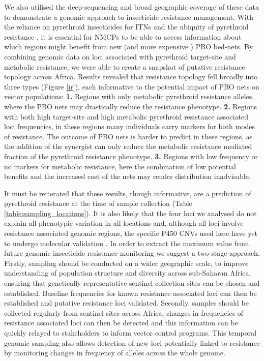 \documentclass[a4paper,11pt,abstracton,hidelinks]{scrartcl}
\begin{document}
We also utilised the deep-sequencing and broad geographic coverage of these data to demonstrate a genomic approach to insecticide resistance management.
%
With the reliance on pyrethroid insecticides for ITNs and the ubiquity of pyrethroid resistance \cite{Hemingway2016}, it is essential for NMCPs to be able to access information about which regions might benefit from new (and more expensive \cite{churcher2016}) PBO bed-nets.
% 
By combining genomic data on loci associated with pyrethroid target-site and metabolic resistance, we were able to create a snapshot of putative resistance topology across Africa.
%
Results revealed that resistance topology fell broadly into three types (Figure \ref{ir}), each informative to the potential impact of PBO nets on vector populations:
\textbf{1.} Regions with only metabolic pyrethroid resistance alleles, where the PBO nets may drastically reduce the resistance phenotype.
%
\textbf{2.} Regions with both high target-site and high metabolic pyrethroid resistance associated loci frequencies, in these regions many individuals carry markers for both modes of resistance.
The outcome of PBO nets is harder to predict in these regions, as the addition of the synergist can only reduce the metabolic resistance mediated fraction of the pyrethroid resistance phenotype.
%
\textbf{3.} Regions with low frequency or no markers for metabolic resistance, here the combination of low potential benefits and the increased cost of the nets may render distribution inadvisable.

It must be reiterated that these results, though informative, are a prediction of pyrethroid resistance at the time of sample collection (Table \ref{table:sampling_locations}).
%
It is also likely that the four loci we analysed do not explain all phenotypic variation in all locations \cite{donnelly2016, mitchell2014} and, although all loci involve resistance associated genomic regions, the specific P450 CNVs used here have yet to undergo molecular validation \cite{lucas2019}.
%
In order to extract the maximum value from future genomic insecticide resistance monitoring we suggest a two stage approach.
%
Firstly, sampling should be conducted on a wider geographic scale, to improve understanding of population structure and diversity across sub-Saharan Africa, ensuring that genetically representative sentinel collection sites can be chosen and established.
%
Baseline frequencies for known resistance associated loci can then be established and putative resistance loci validated.
%
Secondly, samples should be collected regularly from sentinel sites across Africa, changes in frequencies of resistance associated loci can then be detected and this information can be quickly relayed to stakeholders to inform vector control programs.
%
This temporal genomic sampling also allows detection of new loci potentially linked to resistance by monitoring changes in frequency of alleles across the whole genome.
\end{document}
